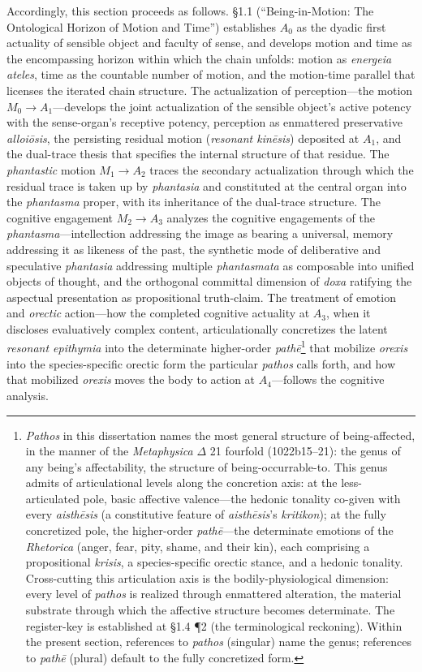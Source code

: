 \documentclass{article}
\begin{document}
Accordingly, this section proceeds as follows. \S 1.1 (``Being-in-Motion: The Ontological Horizon of Motion and Time'') establishes $A_0$ as the dyadic first actuality of sensible object and faculty of sense, and develops motion and time as the encompassing horizon within which the chain unfolds: motion as \textit{energeia ateles}, time as the countable number of motion, and the motion-time parallel that licenses the iterated chain structure. The actualization of perception---the motion $M_0 \rightarrow A_1$---develops the joint actualization of the sensible object's active potency with the sense-organ's receptive potency, perception as enmattered preservative \textit{alloiōsis}, the persisting residual motion (\textit{resonant kinēsis}) deposited at $A_1$, and the dual-trace thesis that specifies the internal structure of that residue. The \textit{phantastic} motion $M_1 \rightarrow A_2$ traces the secondary actualization through which the residual trace is taken up by \textit{phantasia} and constituted at the central organ into the \textit{phantasma} proper, with its inheritance of the dual-trace structure. The cognitive engagement $M_2 \rightarrow A_3$ analyzes the cognitive engagements of the \textit{phantasma}---intellection addressing the image as bearing a universal, memory addressing it as likeness of the past, the synthetic mode of deliberative and speculative \textit{phantasia} addressing multiple \textit{phantasmata} as composable into unified objects of thought, and the orthogonal committal dimension of \textit{doxa} ratifying the aspectual presentation as propositional truth-claim. The treatment of emotion and \textit{orectic} action---how the completed cognitive actuality at $A_3$, when it discloses evaluatively complex content, articulationally concretizes the latent \textit{resonant epithymia} into the determinate higher-order \textit{pathē}\footnote{\textit{Pathos} in this dissertation names the most general structure of being-affected, in the manner of the \textit{Metaphysica} $\Delta$ 21 fourfold (1022b15--21): the genus of any being's affectability, the structure of being-occurrable-to. This genus admits of articulational levels along the concretion axis: at the less-articulated pole, basic affective valence---the hedonic tonality co-given with every \textit{aisthēsis} (a constitutive feature of \textit{aisthēsis}'s \textit{kritikon}); at the fully concretized pole, the higher-order \textit{pathē}---the determinate emotions of the \textit{Rhetorica} (anger, fear, pity, shame, and their kin), each comprising a propositional \textit{krisis}, a species-specific orectic stance, and a hedonic tonality. Cross-cutting this articulation axis is the bodily-physiological dimension: every level of \textit{pathos} is realized through enmattered alteration, the material substrate through which the affective structure becomes determinate. The register-key is established at \S1.4 \P2 (the terminological reckoning). Within the present section, references to \textit{pathos} (singular) name the genus; references to \textit{pathē} (plural) default to the fully concretized form.} that mobilize \textit{orexis} into the species-specific orectic form the particular \textit{pathos} calls forth, and how that mobilized \textit{orexis} moves the body to action at $A_4$---follows the cognitive analysis.
\end{document}
